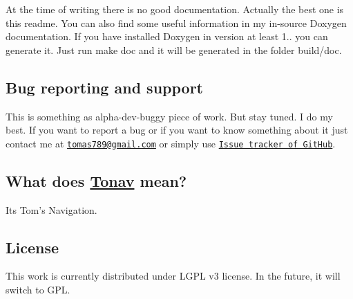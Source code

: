 At the time of writing there is no good documentation. Actually the best one is this readme. You can also find some useful information in my in-\/source Doxygen documentation. If you have installed Doxygen in version at least 1.. you can generate it. Just run {\ttfamily make doc} and it will be generated in the folder {\ttfamily build/doc}.

\subsection*{Bug reporting and support}

This is something as alpha-\/dev-\/buggy piece of work. But stay tuned. I do my best. If you want to report a bug or if you want to know something about it just contact me at \href{mailto:tomas789@gmail.com}{\tt tomas789@gmail.\-com} or simply use \href{https://github.com/tomas789/tonav/issues}{\tt Issue tracker of Git\-Hub}.

\subsection*{What does \hyperlink{class_tonav}{Tonav} mean?}

Its Tom's Navigation.

\subsection*{License}

This work is currently distributed under L\-G\-P\-L v3 license. In the future, it will switch to G\-P\-L. 